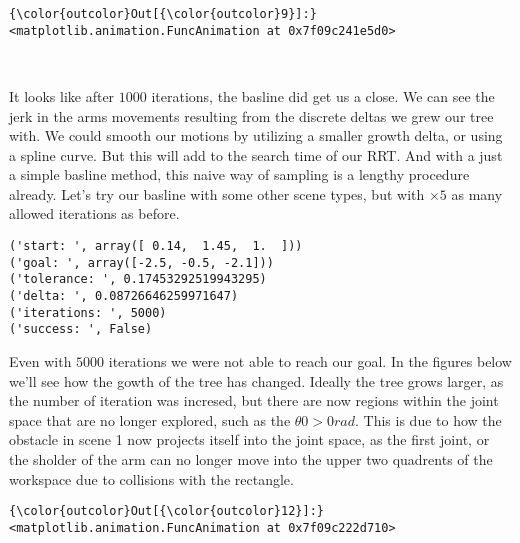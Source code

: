 \documentclass{article}
\begin{document}
            \begin{Verbatim}[commandchars=\\\{\}]
{\color{outcolor}Out[{\color{outcolor}9}]:} <matplotlib.animation.FuncAnimation at 0x7f09c241e5d0>
\end{Verbatim}
        
    \begin{center}
    \end{center}
    { \hspace*{\fill} \\}
    
    It looks like after $1000$ iterations, the basline did get us a close.
We can see the jerk in the arms movements resulting from the discrete
deltas we grew our tree with. We could smooth our motions by utilizing a
smaller growth delta, or using a spline curve. But this will add to the
search time of our RRT. And with a just a simple basline method, this
naive way of sampling is a lengthy procedure already. Let's try our
basline with some other scene types, but with $\times 5$ as many allowed
iterations as before.


    \begin{Verbatim}[commandchars=\\\{\}]
('start: ', array([ 0.14,  1.45,  1.  ]))
('goal: ', array([-2.5, -0.5, -2.1]))
('tolerance: ', 0.17453292519943295)
('delta: ', 0.08726646259971647)
('iterations: ', 5000)
('success: ', False)
    \end{Verbatim}

    Even with $5000$ iterations we were not able to reach our goal. In the
figures below we'll see how the gowth of the tree has changed. Ideally
the tree grows larger, as the number of iteration was incresed, but
there are now regions within the joint space that are no longer
explored, such as the $\theta0 > 0 rad$. This is due to how the obstacle
in scene 1 now projects itself into the joint space, as the first joint,
or the sholder of the arm can no longer move into the upper two
quadrents of the workspace due to collisions with the rectangle.



            \begin{Verbatim}[commandchars=\\\{\}]
{\color{outcolor}Out[{\color{outcolor}12}]:} <matplotlib.animation.FuncAnimation at 0x7f09c222d710>
\end{Verbatim}
        
\end{document}
